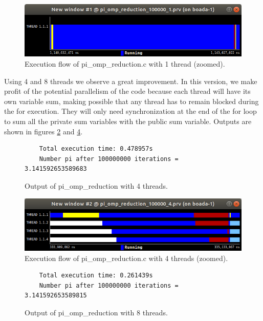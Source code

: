 \documentclass[12pt, a4paper]{article}
\begin{document}
\begin{figure}[H]
  \centering
  \includegraphics[scale=0.5]{./images/pi_omp_reduction_1_zoom}
  \caption{Execution flow of pi\_omp\_reduction.c with 1 thread (zoomed).}
  \label{pi_omp_reduction_1_zoom}
\end{figure}

Using 4 and 8 threads we observe a great improvement. In this version, we make profit of the potential parallelism of the code because each thread will have its own variable sum, making possible that any thread has to remain blocked during the for execution. They will only need synchronization at the end of the for loop to sum all the private sum variables with the public sum variable. Outputs are shown in figures \ref{piompreduction4} and \ref{piompreduction8}.

\begin{figure}[H]
	\begin{lstlisting}
	Total execution time: 0.478957s
	Number pi after 100000000 iterations = 3.141592653589683			
	\end{lstlisting}
	\caption{Output of pi\_omp\_reduction with 4 threads.}
	\label{piompreduction4}
\end{figure}

\begin{figure}[H]
  \centering
  \includegraphics[scale=0.5]{./images/pi_omp_reduction_4_zoom}
  \caption{Execution flow of pi\_omp\_reduction.c with 4 threads (zoomed).}
  \label{pi_omp_reduction_4_zoom}
\end{figure}

\begin{figure}[H]
	\begin{lstlisting}
	Total execution time: 0.261439s
	Number pi after 100000000 iterations = 3.141592653589815
	\end{lstlisting}
	\caption{Output of pi\_omp\_reduction with 8 threads.}
	\label{piompreduction8}
\end{figure}
\end{document}
